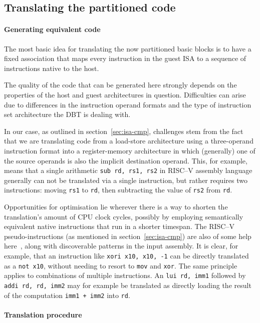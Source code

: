 \subsection{Translating the partitioned code}
\paragraph{Generating equivalent code}
The most basic idea for translating the now partitioned basic blocks is to have a fixed association that maps every instruction in the guest ISA to a sequence of instructions native to the host.

The quality of the code that can be generated here strongly depends on the properties of the host and guest architectures in question.
Difficulties can arise due to differences in the instruction operand formats and the type of instruction set architecture the DBT is dealing with.

In our case, as outlined in section~\ref{sec:isa-cmp}, challenges stem from the fact that we are translating code from a load-store architecture using a three-operand instruction format into a register-memory architecture in which (generally) one of the source operands is also the implicit destination operand.
This, for example, means that a single arithmetic \texttt{sub~rd,~rs1,~rs2} in RISC--V assembly language generally can not be translated via a single instruction, but rather requires two instructions: moving \texttt{rs1} to \texttt{rd}, then subtracting the value of \texttt{rs2} from \texttt{rd}.

Opportunities for optimisation lie wherever there is a way to shorten the translation's amount of CPU clock cycles, possibly by employing semantically equivalent native instructions that run in a shorter timespan.
The RISC--V pseudo-instructions (as mentioned in section~\ref{sec:isa-cmp}) are also of some help here~\cite[S. 139]{riscvspec}, along with discoverable patterns in the input assembly.
It is clear, for example, that an instruction like \texttt{xori~x10,~x10,~-1} can be directly translated as a \texttt{not x10}, without needing to resort to \texttt{mov} and \texttt{xor}.
The same principle applies to combinations of multiple instructions.
An \texttt{lui~rd,~imm1} followed by \texttt{addi~rd,~rd,~imm2} may for example be translated as directly loading the result of the computation \texttt{imm1~+~imm2} into \texttt{rd}.

\paragraph{Translation procedure}

